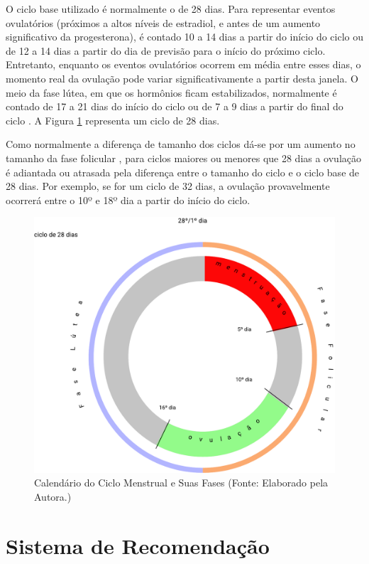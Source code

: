 O ciclo base utilizado é normalmente o de 28 dias. Para representar eventos
ovulatórios (próximos a altos níveis de estradiol, e antes de um aumento significativo da
progesterona), é contado 10 a 14 dias a partir do início do ciclo ou de 12 a 14 dias a partir do
dia de previsão para o início do próximo ciclo. Entretanto, enquanto os eventos ovulatórios ocorrem
em média entre esses dias, o momento real da ovulação pode variar significativamente
a partir desta janela. O meio da fase lútea, em que os hormônios ficam 
estabilizados, normalmente é contado de 17 a 21 dias do início do ciclo 
ou de 7 a 9 dias a partir do final do ciclo \cite{wideman2013}. 
A Figura \ref{fig02} representa um ciclo de 28 dias.

Como normalmente a diferença de tamanho dos ciclos dá-se por um aumento 
no tamanho da fase folicular \cite{lenton1984a}, para ciclos maiores ou 
menores que 28 dias a ovulação é adiantada ou atrasada pela diferença 
entre o tamanho do ciclo e o ciclo base de 28 dias. Por exemplo, se for 
um ciclo de 32 dias, a ovulação provavelmente ocorrerá entre o 10º e 18º dia 
a partir do início do ciclo.

\begin{figure}[h]
	\centering
	\includegraphics[keepaspectratio=true,scale=0.4]{figuras/Group1.pdf}
	\caption{Calendário do Ciclo Menstrual e Suas Fases (Fonte: Elaborado pela Autora.)}
        \label{fig02}
\end{figure}


\section{Sistema de Recomendação}
 
